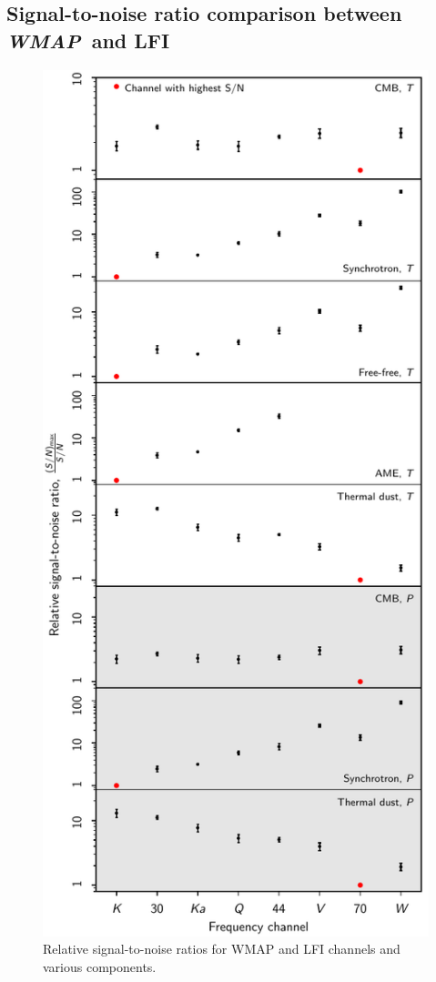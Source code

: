 \documentclass[twocolumn]{../../common/aa}
\def\WMAP{\emph{WMAP}}
\begin{document}
\subsection{Signal-to-noise ratio comparison between \WMAP\ and LFI}
\label{sec:s2n}


\begin{figure}
  \center	
  \includegraphics[width=\linewidth]{figures/fg_s2n_v1.pdf}
  \caption{Relative signal-to-noise ratios for WMAP and LFI channels and various components. }
  \label{fig:fg_s2n}
\end{figure}
\end{document}
